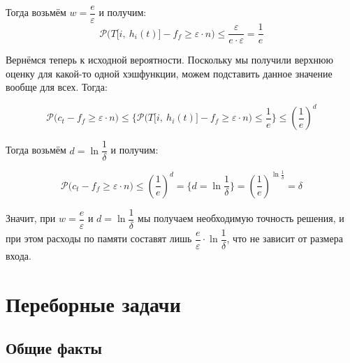 \documentclass[a4paper,12pt]{article}
\renewcommand{\P}{\mathcal{P}}
\begin{document}
Тогда возьмём $w = \dfrac{e}{\varepsilon}$ и получим:
\[\P\big(T\big[i,\ h_i(t)\big] - f_f \geqslant \varepsilon \cdot n\big) \leqslant \dfrac{\varepsilon }{e \cdot \varepsilon} = \dfrac{1}{e}\]

Вернёмся теперь к исходной вероятности. Поскольку мы получили верхнюю оценку для какой-то одной хэшфункции, можем подставить данное значение вообще для всех. Тогда:

\[\P\big(c_t - f_f \geqslant \varepsilon \cdot n\big) \leqslant \Big\{\P\big(T\big[i,\ h_i(t)\big] - f_f \geqslant \varepsilon \cdot n\big) \leqslant\dfrac{1}{e}\Big\} \leqslant \left(\dfrac{1}{e}\right)^d \]

Тогда возьмём $d = \ln \dfrac{1}{\delta}$ и получим:

\[\P\big(c_t - f_f \geqslant \varepsilon \cdot n\big) \leqslant \left(\dfrac{1}{e}\right)^d = \Big\{d = \ln \dfrac{1}{\delta}\Big\} = \left(\dfrac{1}{e}\right)^{\ln\frac{1}{\delta}} = \delta\]

Значит, при $w = \dfrac{e}{\varepsilon}$ и $d = \ln \dfrac{1}{\delta}$ мы получаем необходимую точность решения, и при этом расходы по памяти составят лишь $\dfrac{e}{\varepsilon} \cdot  \ln \dfrac{1}{\delta}$, что не зависит от размера входа.


\newpage
\section{Переборные задачи}

\subsection{Общие факты}
\end{document}
